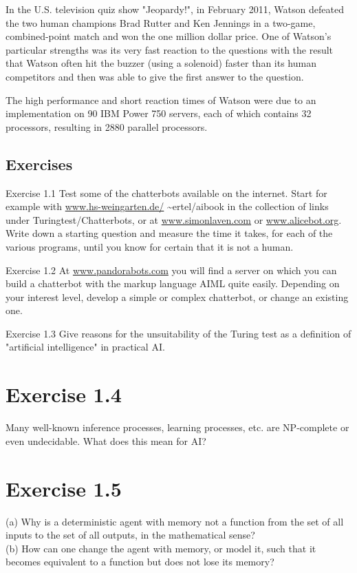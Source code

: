 \documentclass[10pt]{book}
\begin{document}
In the U.S. television quiz show "Jeopardy!", in February 2011, Watson defeated the two human champions Brad Rutter and Ken Jennings in a two-game, combined-point match and won the one million dollar price. One of Watson's particular strengths was its very fast reaction to the questions with the result that Watson often hit the buzzer (using a solenoid) faster than its human competitors and then was able to give the first answer to the question.

The high performance and short reaction times of Watson were due to an implementation on 90 IBM Power 750 servers, each of which contains 32 processors, resulting in 2880 parallel processors.

\subsection{Exercises}
Exercise 1.1 Test some of the chatterbots available on the internet. Start for example with \href{http://www.hs-weingarten.de/}{www.hs-weingarten.de/} \~{}ertel/aibook in the collection of links under Turingtest/Chatterbots, or at \href{http://www.simonlaven.com}{www.simonlaven.com} or \href{http://www.alicebot.org}{www.alicebot.org}. Write down a starting question and measure the time it takes, for each of the various programs, until you know for certain that it is not a human.

Exercise 1.2 At \href{http://www.pandorabots.com}{www.pandorabots.com} you will find a server on which you can build a chatterbot with the markup language AIML quite easily. Depending on your interest level, develop a simple or complex chatterbot, or change an existing one.

Exercise 1.3 Give reasons for the unsuitability of the Turing test as a definition of "artificial intelligence" in practical AI.\\
\section{Exercise 1.4}
Many well-known inference processes, learning processes, etc. are NP-complete or even undecidable. What does this mean for AI?

\section{Exercise 1.5}
(a) Why is a deterministic agent with memory not a function from the set of all inputs to the set of all outputs, in the mathematical sense?\\
(b) How can one change the agent with memory, or model it, such that it becomes equivalent to a function but does not lose its memory?\\
\end{document}
